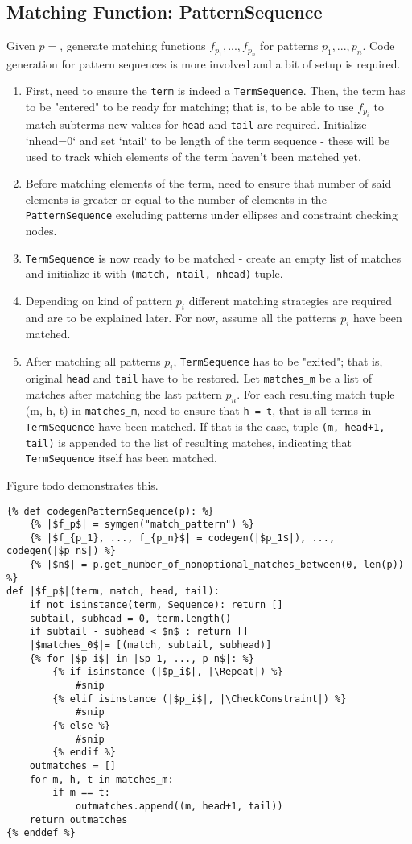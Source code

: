 \subsection{Matching Function: PatternSequence}
Given $p = $\PatternSequence, generate matching functions $f_{p_1}, ..., f_{p_n}$ for patterns $p_1, ..., p_n$. Code generation for pattern sequences is more involved and a bit of setup is required. 

\begin{enumerate}
\item
First, need to ensure the \texttt{term} is indeed a \texttt{TermSequence}.  Then, the term has to be "entered" to be ready for matching; that is, to be able to use $f_{p_i}$ to match subterms new values for \texttt{head} and \texttt{tail} are required. Initialize `nhead=0` and set `ntail` to be length of the term sequence - these will be used to track which elements of the term haven't been matched yet. 
\item Before matching elements of the term, need to ensure that number of said elements is greater or equal to the number of elements in the \texttt{PatternSequence} excluding patterns under ellipses and constraint checking nodes. 
\item \texttt{TermSequence} is now ready to be matched - create an empty list of matches  and initialize it with \texttt{(match, ntail, nhead)} tuple. 
\item 
Depending on kind of pattern $p_i$ different matching strategies are required and are to be explained later. For now, assume all the patterns $p_i$ have been matched.
\item
After matching all patterns $p_i$, \texttt{TermSequence} has to be "exited"; that is, original \texttt{head} and \texttt{tail} have to be restored. Let \texttt{matches\_m} be a list of matches after matching the last pattern $p_n$. For each resulting match tuple (m, h, t) in \texttt{matches\_m}, need to ensure that \texttt{h = t}, that is all terms in \texttt{TermSequence} have been matched. If that is the case, tuple \texttt{(m, head+1, tail)} is appended to the list of resulting matches, indicating that \texttt{TermSequence} itself has been matched.
\end{enumerate}

Figure todo demonstrates this.
\begin{verbatim}
{% def codegenPatternSequence(p): %}
	{% |$f_p$| = symgen("match_pattern") %}
	{% |$f_{p_1}, ..., f_{p_n}$| = codegen(|$p_1$|), ...,  codegen(|$p_n$|) %}
	{% |$n$| = p.get_number_of_nonoptional_matches_between(0, len(p)) %}
def |$f_p$|(term, match, head, tail):
	if not isinstance(term, Sequence): return []
	subtail, subhead = 0, term.length()
	if subtail - subhead < $n$ : return []
	|$matches_0$|= [(match, subtail, subhead)]
	{% for |$p_i$| in |$p_1, ..., p_n$|: %}
		{% if isinstance (|$p_i$|, |\Repeat|) %}
			#snip
		{% elif isinstance (|$p_i$|, |\CheckConstraint|) %}
			#snip
		{% else %}
			#snip
		{% endif %}
	outmatches = []
	for m, h, t in matches_m:
		if m == t:
			outmatches.append((m, head+1, tail))
	return outmatches
{% enddef %}
\end{verbatim}

